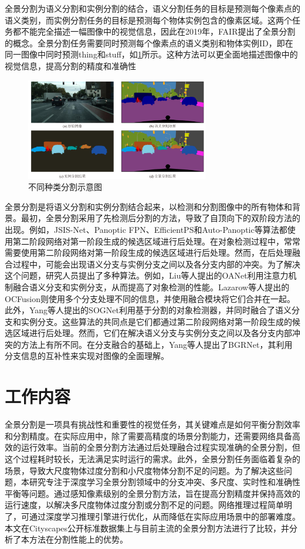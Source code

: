 全景分割为语义分割和实例分割的结合，语义分割任务的目标是预测每个像素点的语义类别，而实例分割任务的目标是预测每个物体实例包含的像素区域。这两个任务都不能完全描述一幅图像中的视觉信息，因此在2019年，FAIR\cite{zhao2017pyramid}提出了全景分割的概念。全景分割任务需要同时预测每个像素点的语义类别和物体实例ID，即在同一图像中同时预测thing和stuff，如\cref*{fig:f1a}所示。这种方法可以更全面地描述图像中的视觉信息，提高分割的精度和准确性
\begin{figure}[htb]
    \centering
    \includegraphics[width=8cm]{fig/chap1/全景分割1.png}
    \caption{不同种类分割示意图}
    \label{fig:f1a}
\end{figure}

全景分割是将语义分割和实例分割结合起来，以检测和分割图像中的所有物体和背景\cite{liu2020deep}。最初，全景分割采用了先检测后分割的方法，导致了自顶向下的双阶段方法的出现。例如，JSIS-Net、Panoptic FPN、EfficientPS和Auto-Panoptic等算法都使用第二阶段网络对第一阶段生成的候选区域进行后处理\cite{li2018detnet}。在对象检测过程中，常常需要使用第二阶段网络对第一阶段生成的候选区域进行后处理。然而，在后处理融合过程中，可能会出现语义分支与实例分支之间以及各分支内部的冲突。为了解决这个问题，研究人员提出了多种算法。例如，Liu等人提出的OANet利用注意力机制融合语义分支和实例分支，从而提高了对象检测的性能\cite{li2017fully}。Lazarow等人提出的OCFusion则使用多个分支处理不同的信息，并使用融合模块将它们合并在一起\cite{wang2018pelee}。此外，Yang等人提出的SOGNet利用基于分割的对象检测器，并同时融合了语义分支和实例分支\cite{chen2018searching}。这些算法的共同点是它们都通过第二阶段网络对第一阶段生成的候选区域进行后处理。然而，它们在解决语义分支与实例分支之间以及各分支内部冲突的方法上有所不同。在分支融合的基础上，Yang等人提出了BGRNet，其利用分支信息的互补性来实现对图像的全面理解。



\section{工作内容}
全景分割是一项具有挑战性和重要性的视觉任务，其关键难点是如何平衡分割效率和分割精度。在实际应用中，除了需要高精度的场景分割能力，还需要网络具备高效的运行效率。当前的全景分割方法通过后处理融合过程实现准确的全景分割，但这个过程耗时较长，无法满足实时运行的需求。此外，全景分割任务面临着复杂的场景，导致大尺度物体过度分割和小尺度物体分割不足的问题。为了解决这些问题，本研究专注于深度学习全景分割领域中的分支冲突、多尺度、实时性和准确性平衡等问题。通过感知像素级别的全景分割方法，旨在提高分割精度并保持高效的运行速度，以解决多尺度物体过度分割或分割不足的问题。网络推理过程简单明了，可通过深度学习推理引擎进行优化，从而降低在实际应用场景中的部署难度\cite{chandan2018real}。本文在Cityscapes公开标准数据集上与目前主流的全景分割方法进行了比较，并分析了本方法在分割性能上的优势。
